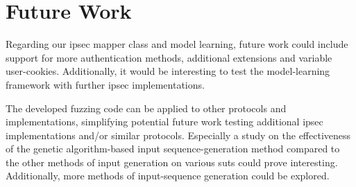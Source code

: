 \section{Future Work}
Regarding our \ac{ipsec} mapper class and model learning, future work could include support for more authentication methods, additional extensions and variable user-cookies. Additionally, it would be interesting to test the model-learning framework with further \ac{ipsec} implementations.

The developed fuzzing code can be applied to other protocols and implementations, simplifying potential future work testing additional \ac{ipsec} implementations and/or similar protocols. Especially a study on the effectiveness of the genetic algorithm-based input sequence-generation method compared to the other methods of input generation on various \acp{sut} could prove interesting. Additionally, more methods of input-sequence generation could be explored.
